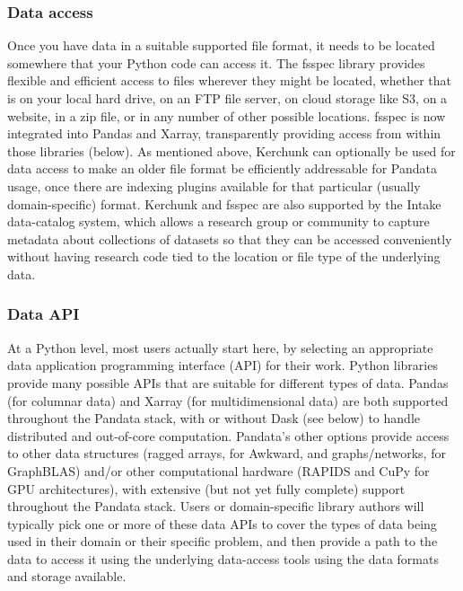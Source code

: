 \subsubsection{Data access}

Once you have data in a suitable supported file format, it needs to be located somewhere that your Python code can access it. The fsspec library provides flexible and efficient access to files wherever they might be located, whether that is on your local hard drive, on an FTP file server, on cloud storage like S3, on a website, in a zip file, or in any number of other possible locations. fsspec is now integrated into Pandas and Xarray, transparently providing access from within those libraries (below). As mentioned above, Kerchunk can optionally be used for data access to make an older file format be efficiently addressable for Pandata usage, once there are indexing plugins available for that particular (usually domain-specific) format. Kerchunk and fsspec are also supported by the Intake data-catalog system, which allows a research group or community to capture metadata about collections of datasets so that they can be accessed conveniently without having research code tied to the location or file type of the underlying data.

\subsubsection{Data API}

At a Python level, most users actually start here, by selecting an appropriate data application programming interface (API) for their work. Python libraries provide many possible APIs that are suitable for different types of data. Pandas (for columnar data) and Xarray (for multidimensional data) are both supported throughout the Pandata stack, with or without Dask (see below) to handle distributed and out-of-core computation. Pandata's other options provide access to other data structures (ragged arrays, for Awkward, and graphs/networks, for GraphBLAS) and/or other computational hardware (RAPIDS and CuPy for GPU architectures), with extensive (but not yet fully complete) support throughout the Pandata stack. Users or domain-specific library authors will typically pick one or more of these data APIs to cover the types of data being used in their domain or their specific problem, and then provide a path to the data to access it using the underlying data-access tools using the data formats and storage available.

